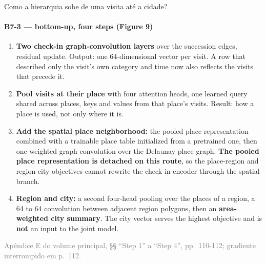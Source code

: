 \documentclass{beamer}
\begin{document}
\begin{frame}[noframenumbering]{Como a hierarquia sobe de uma visita até a cidade?}
    \framesubtitle{B7-3 --- bottom-up, four steps (Figure 9)}
    \hypertarget{b73}{}
    \small\begin{enumerate}\setlength{\itemsep}{0pt}\setlength{\parskip}{0pt}
        \item \textbf{Two check-in graph-convolution layers} over the succession edges, residual update. Output: one 64-dimensional vector per visit. A row that described only the visit's own category and time now also reflects the visits that precede it.
        \item \textbf{Pool visits at their place} with four attention heads, one learned query shared across places, keys and values from that place's visits. Result: how a place is used, not only where it is.
        \item \textbf{Add the spatial place neighborhood:} the pooled place representation combined with a trainable place table initialized from a pretrained one, then one weighted graph convolution over the Delaunay place graph. \textbf{The pooled place representation is detached on this route}, so the place-region and region-city objectives cannot rewrite the check-in encoder through the spatial branch.
        \item \textbf{Region and city:} a second four-head pooling over the places of a region, a 64 to 64 convolution between adjacent region polygons, then an \textbf{area-weighted city summary}. The city vector serves the highest objective and is \textbf{not} an input to the joint model.
    \end{enumerate}
    \vfill
    {\scriptsize
    \begin{minipage}[b]{0.775\linewidth}\raggedright\textcolor{gray}{Apêndice E do volume principal, §§ ``Step 1'' a ``Step 4'', pp.~110-112; gradiente interrompido em p.~112.}\end{minipage}\hfill
    \begin{minipage}[b]{0.20\linewidth}\raggedleft \hyperlink{b0}{}\end{minipage}}
\end{frame}
\end{document}
